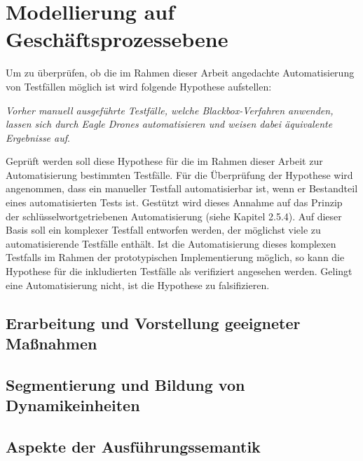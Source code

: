 \section{Modellierung auf Geschäftsprozessebene}
Um zu überprüfen, ob die im Rahmen dieser Arbeit angedachte Automatisierung von Testfällen möglich ist wird folgende Hypothese aufstellen: 

\textit{Vorher manuell ausgeführte Testfälle, welche Blackbox-Verfahren anwenden, lassen sich durch Eagle Drones automatisieren und weisen dabei äquivalente Ergebnisse auf}. 

Geprüft werden soll diese Hypothese für die im Rahmen dieser Arbeit zur Automatisierung bestimmten Testfälle. Für die Überprüfung der Hypothese wird angenommen, dass ein manueller Testfall automatisierbar ist, wenn er Bestandteil eines automatisierten Tests ist. Gestützt wird dieses Annahme auf das Prinzip der schlüsselwortgetriebenen Automatisierung (siehe Kapitel 2.5.4). Auf dieser Basis soll ein komplexer Testfall entworfen werden, der möglichst viele zu automatisierende Testfälle enthält. Ist die Automatisierung dieses komplexen Testfalls im Rahmen der prototypischen Implementierung möglich, so kann die Hypothese für die inkludierten Testfälle als verifiziert angesehen werden. Gelingt eine Automatisierung nicht, ist die Hypothese zu falsifizieren.

\subsection{Erarbeitung und Vorstellung geeigneter Maßnahmen}

\subsection{Segmentierung und Bildung von Dynamikeinheiten}

\subsection{Aspekte der Ausführungssemantik}
